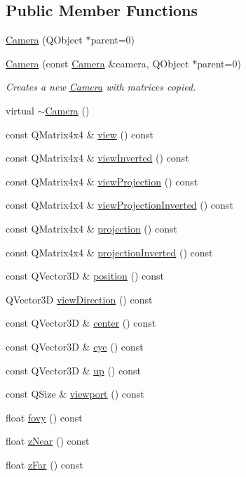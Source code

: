 \subsection*{Public Member Functions}
\begin{DoxyCompactItemize}
\item 
\hyperlink{class_camera_ad56e137b78c37179019cf90005af9b29}{Camera} (Q\+Object $\ast$parent=0)
\item 
\hyperlink{class_camera_a33ad49c0e2c636d279be20bacc0d1757}{Camera} (const \hyperlink{class_camera}{Camera} \&camera, Q\+Object $\ast$parent=0)
\begin{DoxyCompactList}\small\item\em Creates a new \hyperlink{class_camera}{Camera} with matrices copied. \end{DoxyCompactList}\item 
virtual \hyperlink{class_camera_ad1897942d0ccf91052386388a497349f}{$\sim$\+Camera} ()
\item 
const Q\+Matrix4x4 \& \hyperlink{class_camera_a6797f30b3a8a94a798a9687be4e1d825}{view} () const 
\item 
const Q\+Matrix4x4 \& \hyperlink{class_camera_a6f373d44131b72f23b4a23ef3b13f90b}{view\+Inverted} () const 
\item 
const Q\+Matrix4x4 \& \hyperlink{class_camera_a683759f8c6c9207192a4c8b3f12be8e7}{view\+Projection} () const 
\item 
const Q\+Matrix4x4 \& \hyperlink{class_camera_a5ee2df09ee42e1ddddf7b6dc3de330e4}{view\+Projection\+Inverted} () const 
\item 
const Q\+Matrix4x4 \& \hyperlink{class_camera_af87d251359157acdb6e540d63a933392}{projection} () const 
\item 
const Q\+Matrix4x4 \& \hyperlink{class_camera_a6108163876720d7e856ac91c6835cde9}{projection\+Inverted} () const 
\item 
const Q\+Vector3\+D \& \hyperlink{class_camera_aa03eb8b412fd5c6a496072503c78ee95}{position} () const 
\item 
Q\+Vector3\+D \hyperlink{class_camera_a3b5d47728aad185b6471e9d641e5716e}{view\+Direction} () const 
\item 
const Q\+Vector3\+D \& \hyperlink{class_camera_a3eabf004448f650a632365cfd3d6980b}{center} () const 
\item 
const Q\+Vector3\+D \& \hyperlink{class_camera_a2558b66a8e6b053468bb1f5ffcc5841b}{eye} () const 
\item 
const Q\+Vector3\+D \& \hyperlink{class_camera_a86a19bc4ac24604bb5c0b3f4b6dad193}{up} () const 
\item 
const Q\+Size \& \hyperlink{class_camera_af74af0fabb70490072ebeb013582284a}{viewport} () const 
\item 
float \hyperlink{class_camera_a74f8741128595da3efa466cb5e580601}{fovy} () const 
\item 
float \hyperlink{class_camera_a898b996f8cc534948886387193bcbc52}{z\+Near} () const 
\item 
float \hyperlink{class_camera_a14e0e8d92dfcd76624780288caa7de8e}{z\+Far} () const 
\end{DoxyCompactItemize}
